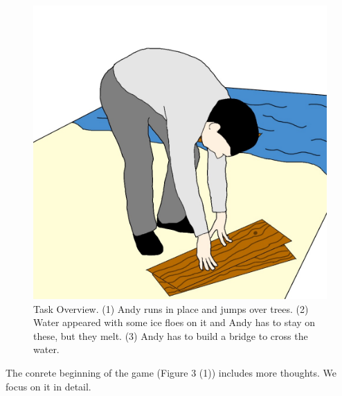 \documentclass[twocolumn,showpacs,%
  nofootinbib,aps,superscriptaddress,%
  eqsecnum,prd,notitlepage,showkeys,10pt]{revtex4-1}
\begin{document}
\begin{figure}[!htb]
\endminipage\hfill
{}%
  \includegraphics[width=\linewidth]{graphics/Image(3).jpg}
\endminipage
  \caption{Task Overview. (1) Andy runs in place and jumps over trees. (2) Water appeared  with some ice floes on it and Andy has to stay on these, but they melt. (3) Andy has to build a bridge to cross the water.}\label{fig:awesome_image3}
\end{figure}

The conrete beginning of the game (Figure 3 (1)) includes more thoughts. We focus on it in detail.
\end{document}
